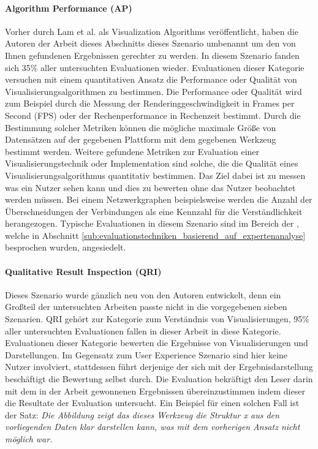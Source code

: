 \documentclass[draft=false
              ,paper=a4
              ,twoside=false
              ,fontsize=11pt
              ,headsepline
              ,BCOR10mm
              ,DIV11
              ]{scrbook}
\begin{document}
\paragraph{Algorithm Performance (AP)} %
\label{par:algorithm_performance_}
Vorher durch Lam et al. als Visualization Algorithms veröffentlicht, haben die Autoren der Arbeit dieses Abschnitts dieses Szenario umbenannt um den von Ihnen gefundenen Ergebnissen gerechter zu werden. In diesem Szenario fanden sich 35\% aller untersuchten Evaluationen wieder. Evaluationen dieser Kategorie versuchen mit einem quantitativen Ansatz die Performance oder Qualität von Visualisierungsalgorithmen zu bestimmen. Die Performance oder Qualität wird zum Beispiel durch die Messung der Renderinggeschwindigkeit in Frames per Second (FPS) oder der Rechenperformance in Rechenzeit bestimmt. Durch die Bestimmung solcher Metriken können die mögliche maximale Größe von Datensätzen auf der gegebenen Plattform mit dem gegebenen Werkzeug bestimmt werden. Weitere gefundene Metriken zur Evaluation einer Visualisierungstechnik oder Implementation sind solche, die die Qualität eines Visualisierungsalgorithmus quantitativ bestimmen. Das Ziel dabei ist zu messen was ein Nutzer sehen kann und dies zu bewerten ohne das Nutzer beobachtet werden müssen. Bei einem Netzwerkgraphen beispielsweise werden die Anzahl der Überschneidungen der Verbindungen als eine Kennzahl für die Verständlichkeit herangezogen. Typische Evaluationen in diesem Szenario sind im Bereich der , welche in Abschnitt \ref{sub:evaluationstechniken_basierend_auf_expertenanalyse} besprochen wurden, angesiedelt.

\paragraph{Qualitative Result Inspection (QRI)} %
\label{par:qualitative_result_inspection_}
Dieses Szenario wurde gänzlich neu von den Autoren entwickelt, denn ein Großteil der untersuchten Arbeiten passte nicht in die vorgegebenen sieben Szenarien. QRI gehört zur Kategorie zum Verständnis von Visualisierungen, 95\% aller untersuchten Evaluationen fallen in dieser Arbeit in diese Kategorie. Evaluationen dieser Kategorie bewerten die Ergebnisse von Visualisierungen und Darstellungen. Im Gegensatz zum User Experience Szenario sind hier keine Nutzer involviert, stattdessen führt derjenige der sich mit der Ergebnisdarstellung beschäftigt die Bewertung selbst durch. Die Evaluation bekräftigt den Leser darin mit dem in der Arbeit gewonnenen Ergebnissen übereinzustimmen indem dieser die Resultate der Evaluation untersucht. Ein Beispiel für einen solchen Fall ist der Satz: \textit{\glqq Die Abbildung zeigt das dieses Werkzeug die Struktur x aus den vorliegenden Daten klar darstellen kann, was mit dem vorherigen Ansatz nicht möglich war.\grqq} 
\end{document}
